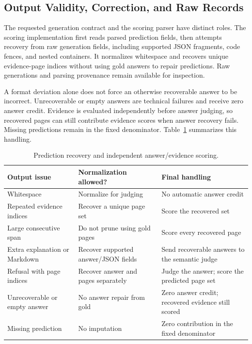 \documentclass{article} %
\begin{document}
\subsection{Output Validity, Correction, and Raw Records}
\label{app:output_validity}

The requested generation contract and the scoring parser have distinct roles. The scoring implementation first reads parsed prediction fields, then attempts recovery from raw generation fields, including supported JSON fragments, code fences, and nested containers. It normalizes whitespace and recovers unique evidence-page indices without using gold answers to repair predictions. Raw generations and parsing provenance remain available for inspection.

A format deviation alone does not force an otherwise recoverable answer to be incorrect. Unrecoverable or empty answers are technical failures and receive zero answer credit. Evidence is evaluated independently before answer judging, so recovered pages can still contribute evidence scores when answer recovery fails. Missing predictions remain in the fixed denominator. Table~\ref{tab:app_output_handling} summarizes this handling.

\begin{table}[!htb]
\centering
\caption{Prediction recovery and independent answer/evidence scoring.}
\label{tab:app_output_handling}
\small
\begin{tabularx}{\linewidth}{X X X}
\toprule
\textbf{Output issue} & \textbf{Normalization allowed?} & \textbf{Final handling} \\
\midrule
Whitespace & Normalize for judging & No automatic answer credit \\
Repeated evidence indices & Recover a unique page set & Score the recovered set \\
Large consecutive span & Do not prune using gold pages & Score every recovered page \\
Extra explanation or Markdown & Recover supported answer/JSON fields & Send recoverable answers to the semantic judge \\
Refusal with page indices & Recover answer and pages separately & Judge the answer; score the predicted page set \\
Unrecoverable or empty answer & No answer repair from gold & Zero answer credit; recovered evidence still scored \\
Missing prediction & No imputation & Zero contribution in the fixed denominator \\
\bottomrule
\end{tabularx}
\end{table}
\end{document}
